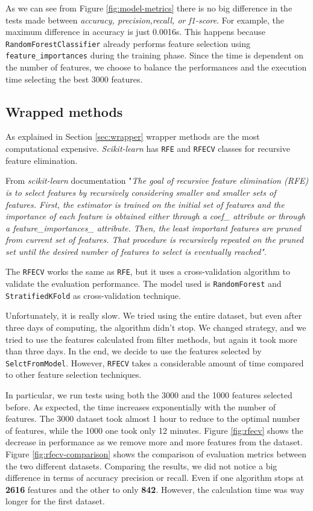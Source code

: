As we can see from Figure \ref{fig:model-metrics} there is no big difference in the tests made between \textit{accuracy, precision,recall, or f1-score}. For example, the maximum difference in accuracy is just 0.0016s. This happens because \texttt{RandomForestClassifier} already performs feature selection using \texttt{feature\_importances} during the training phase. Since the time is dependent on the number of features, we choose to balance the performances and the execution time selecting the best 3000 features.

\subsection{Wrapped methods}

As explained in Section \ref{sec:wrapper} wrapper methods are the most computational expensive. \textit{Scikit-learn} has \texttt{RFE} and \texttt{RFECV} classes for recursive feature elimination. 

From \textit{scikit-learn} documentation \cite{rfe} "\textit{The goal of recursive feature elimination (RFE) is to select features by recursively considering smaller and smaller sets of features. First, the estimator is trained on the initial set of features and the importance of each feature is obtained either through a coef\_ attribute or through a feature\_importances\_ attribute. Then, the least important features are pruned from current set of features. That procedure is recursively repeated on the pruned set until the desired number of features to select is eventually reached"}.

The \texttt{RFECV} works the same as \texttt{RFE}, but it uses a cross-validation algorithm to validate the evaluation performance.
The model used is \texttt{RandomForest} and \texttt{StratifiedKFold} as cross-validation technique.

Unfortunately, it is really slow. We tried using the entire dataset, but even after three days of computing, the algorithm didn't stop. We changed strategy, and we tried to use the features calculated from filter methods, but again it took more than three days. In the end, we decide to use the features selected by \texttt{SelctFromModel}. However, \texttt{RFECV} takes a considerable amount of time compared to other feature selection techniques.

In particular, we run tests using both the 3000 and the 1000 features selected before. As expected, the time increases exponentially with the number of features. The 3000 dataset took almost 1 hour to reduce to the optimal number of features, while the 1000 one took only 12 minutes.  Figure \ref{fig:rfecv} shows the decrease in performance as we remove more and more features from the dataset. Figure \ref{fig:rfecv-comparison} shows the comparison of evaluation metrics between the two different datasets.
Comparing the results, we did not notice a big difference in terms of accuracy precision or recall. Even if one algorithm stops at \textbf{2616} features and the other to only \textbf{842}. However, the calculation time was way longer for the first dataset. 


